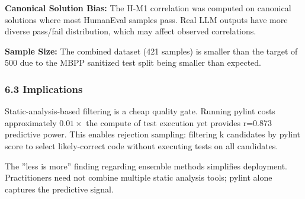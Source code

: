 \textbf{Canonical Solution Bias:} The H-M1 correlation was computed on canonical solutions where most HumanEval samples pass. Real LLM outputs have more diverse pass/fail distribution, which may affect observed correlations.

\textbf{Sample Size:} The combined dataset (421 samples) is smaller than the target of 500 due to the MBPP sanitized test split being smaller than expected.

\subsubsection{6.3 Implications}

Static-analysis-based filtering is a cheap quality gate. Running pylint costs approximately 0.$01\times$ the compute of test execution yet provides r=0.873 predictive power. This enables rejection sampling: filtering k candidates by pylint score to select likely-correct code without executing tests on all candidates.

The ''less is more'' finding regarding ensemble methods simplifies deployment. Practitioners need not combine multiple static analysis tools; pylint alone captures the predictive signal.
